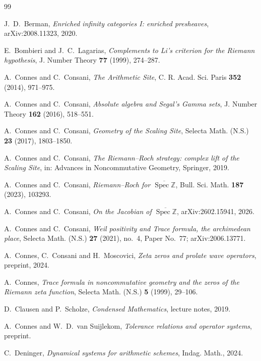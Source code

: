 \documentclass[11pt]{amsart}
\theoremstyle{definition}
\theoremstyle{remark}
\newcommand{\Z}{\mathbb Z}
\newcommand{\Spec}{\operatorname{Spec}}
\begin{document}
\begin{thebibliography}{99}

J.~D.~Berman, \emph{Enriched infinity categories I: enriched presheaves},
arXiv:2008.11323, 2020.

E.~Bombieri and J.~C.~Lagarias, \emph{Complements to Li's criterion for the
Riemann hypothesis}, J. Number Theory \textbf{77} (1999), 274--287.

A.~Connes and C.~Consani, \emph{The Arithmetic Site},
C. R. Acad. Sci. Paris \textbf{352} (2014), 971--975.

A.~Connes and C.~Consani, \emph{Absolute algebra and Segal's Gamma sets},
J. Number Theory \textbf{162} (2016), 518--551.

A.~Connes and C.~Consani, \emph{Geometry of the Scaling Site},
Selecta Math. (N.S.) \textbf{23} (2017), 1803--1850.

A.~Connes and C.~Consani, \emph{The Riemann--Roch strategy: complex lift of
the Scaling Site}, in: Advances in Noncommutative Geometry, Springer, 2019.

A.~Connes and C.~Consani, \emph{Riemann--Roch for
$\overline{\Spec\Z}$}, Bull. Sci. Math. \textbf{187} (2023), 103293.

A.~Connes and C.~Consani, \emph{On the Jacobian of
$\overline{\Spec\Z}$}, arXiv:2602.15941, 2026.

A.~Connes and C.~Consani, \emph{Weil positivity and Trace formula, the
archimedean place}, Selecta Math. (N.S.) \textbf{27} (2021), no.~4, Paper
No.~77; arXiv:2006.13771.

A.~Connes, C.~Consani and H.~Moscovici, \emph{Zeta zeros and prolate wave
operators}, preprint, 2024.

A.~Connes, \emph{Trace formula in noncommutative geometry and the zeros of
the Riemann zeta function}, Selecta Math. (N.S.) \textbf{5} (1999), 29--106.

D.~Clausen and P.~Scholze, \emph{Condensed Mathematics}, lecture notes,
2019.

A.~Connes and W.~D.~van Suijlekom, \emph{Tolerance relations and operator
systems}, preprint.

C.~Deninger, \emph{Dynamical systems for arithmetic schemes},
Indag. Math., 2024.


\end{thebibliography}
\end{document}
